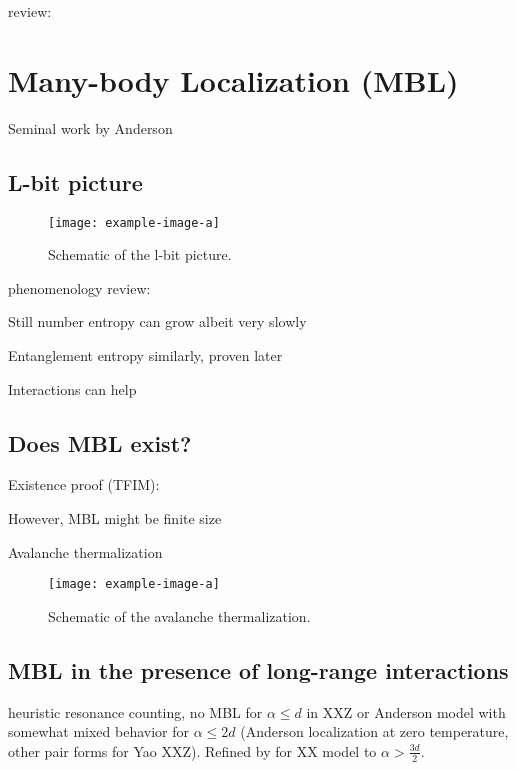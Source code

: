 review: \cite{moriThermalizationPrethermalizationIsolated2018}

\section{Many-body Localization (MBL)}\label{sec:MBL}

Seminal work by Anderson \cite{andersonAbsenceDiffusionCertain1958}

\subsection{L-bit picture}

\begin{figure}[htb]
	\centering
	\texttt{[image: example-image-a]}
	\caption{Schematic of the l-bit picture.}
\end{figure}

phenomenology review: \cite{imbrieReviewLocalIntegrals2017}


Still number entropy can grow albeit very slowly\cite{kiefer-emmanouilidisEvidenceUnboundedGrowth2020,chavezUltraslowGrowthNumber2023}

Entanglement entropy similarly\cite{bardarsonUnboundedGrowthEntanglement2012}, proven later\cite{huangExtensiveEntropyUnitary2021}

Interactions can help\cite{huangInteractionenhancedManybodyLocalization2024}

\subsection{Does MBL exist?}
Existence proof (TFIM): \cite{imbrieManyBodyLocalizationQuantum2016}

However, MBL might be finite size

Avalanche thermalization

\begin{figure}[htb]
	\centering
	\texttt{[image: example-image-a]}
	\caption{Schematic of the avalanche thermalization.}
\end{figure}

\subsection{MBL in the presence of long-range interactions}

heuristic resonance counting, no MBL for $\alpha\leq d$ in XXZ \cite{yaoManyBodyLocalizationDipolar2014,burinManybodyDelocalizationStrongly2015,gutmanEnergyTransportAnderson2016} or Anderson model \cite{burinEnergyDelocalizationStrongly2006} with somewhat mixed behavior for $\alpha\leq 2d$ (Anderson localization at zero temperature, other pair forms for Yao XXZ). Refined by \cite{burinLocalizationRandomXY2015} for XX model to $\alpha > \frac{3d}{2}$.

